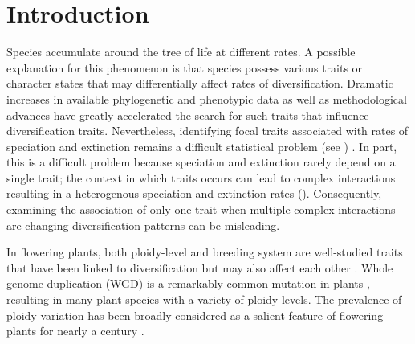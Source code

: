 \section{Introduction}


Species accumulate around the tree of life at different rates.
A possible explanation for this phenomenon is that species possess various traits or character states that may differentially affect rates of diversification. %
Dramatic increases in available phylogenetic and phenotypic data %
as well as methodological advances %
have greatly accelerated the search for such traits that influence diversification traits. Nevertheless, identifying focal traits associated with rates of speciation and extinction remains a difficult statistical problem (see \citep{maddison_2015, rabosky_2015, moore_2016, fitzjohn_2009, goldberg_2012, beaulieu_2016, rabosky_2017}) . %
In part, this is a difficult problem because speciation and extinction rarely depend on a single trait; the context  in which traits occurs can lead to complex interactions resulting in a heterogenous speciation and extinction rates (\citep{beaulieu_2016, caetano_2018, herrera_2018}). Consequently, examining the association of only one trait when multiple complex interactions are changing diversification patterns can be misleading.

In flowering plants, both ploidy-level and breeding system are well-studied traits that have been linked to diversification but may also affect each other \citep{stebbins1950}. 
Whole genome duplication (WGD) is a remarkably common mutation in plants \citep{husband_2013, zenilferguson_2017}, resulting in many plant species with a variety of ploidy levels. The prevalence of ploidy variation has been broadly considered as a salient feature of flowering plants for nearly a century \citep{stebbins1938}. 


